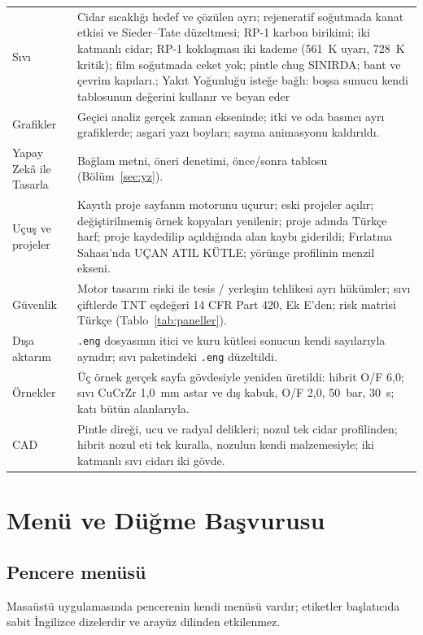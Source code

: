 \documentclass[11pt,a4paper]{article}
\newcommand{\ui}[1]{\textsf{#1}}
\newcommand{\kod}[1]{\texttt{#1}}
\begin{document}
\begin{longtable}{@{}>{\raggedright\arraybackslash}p{3.6cm}>{\raggedright\arraybackslash}p{12.0cm}@{}}
Sıvı & Cidar sıcaklığı hedef ve çözülen ayrı; rejeneratif soğutmada kanat etkisi ve Sieder--Tate düzeltmesi; RP-1 karbon birikimi; iki katmanlı cidar; RP-1 koklaşması iki kademe (561~K uyarı, 728~K kritik); film soğutmada ceket yok; pintle chug \ui{SINIRDA}; bant ve çevrim kapıları.; \ui{Yakıt Yoğunluğu} isteğe bağlı: boşsa sunucu kendi tablosunun değerini kullanır ve beyan eder \\
Grafikler & Geçici analiz gerçek zaman ekseninde; itki ve oda basıncı ayrı grafiklerde; asgari yazı boyları; sayma animasyonu kaldırıldı. \\
Yapay Zekâ ile Tasarla & Bağlam metni, öneri denetimi, önce/sonra tablosu (Bölüm~\ref{sec:yz}). \\
Uçuş ve projeler & Kayıtlı proje sayfanın motorunu uçurur; eski projeler açılır; değiştirilmemiş örnek kopyaları yenilenir; proje adında Türkçe harf; proje kaydedilip açıldığında alan kaybı giderildi; Fırlatma Sahası'nda \ui{UÇAN ATIL KÜTLE}; yörünge profilinin menzil ekseni. \\
Güvenlik & Motor tasarım riski ile tesis / yerleşim tehlikesi ayrı hükümler; sıvı çiftlerde TNT eşdeğeri 14 CFR Part 420, Ek E'den; risk matrisi Türkçe (Tablo~\ref{tab:paneller}). \\
Dışa aktarım & \kod{.eng} dosyasının itici ve kuru kütlesi sonucun kendi sayılarıyla aynıdır; sıvı paketindeki \kod{.eng} düzeltildi. \\
Örnekler & Üç örnek gerçek sayfa gövdesiyle yeniden üretildi: hibrit O/F 6,0; sıvı CuCrZr 1,0~mm astar ve dış kabuk, O/F 2,0, 50~bar, 30~s; katı bütün alanlarıyla. \\
CAD & Pintle direği, ucu ve radyal delikleri; nozul tek cidar profilinden; hibrit nozul eti tek kuralla, nozulun kendi malzemesiyle; iki katmanlı sıvı cidarı iki gövde. \\
\end{longtable}

\appendix

\section{Menü ve Düğme Başvurusu}\label{sec:eka}

\subsection{Pencere menüsü}

Masaüstü uygulamasında pencerenin kendi menüsü vardır; etiketler başlatıcıda
sabit İngilizce dizelerdir ve arayüz dilinden etkilenmez.
\end{document}
